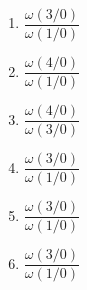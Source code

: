 \documentclass[10pt,fleqn]{article} %
\begin{document}
\begin{multicols}{2}
\begin{enumerate}
\item $\dfrac{\omega(3/0)}{\omega(1/0)}$
\item $\dfrac{\omega(4/0)}{\omega(1/0)}$
\item $\dfrac{\omega(4/0)}{\omega(3/0)}$
\item $\dfrac{\omega(3/0)}{\omega(1/0)}$
\item $\dfrac{\omega(3/0)}{\omega(1/0)}$
\item $\dfrac{\omega(3/0)}{\omega(1/0)}$
\end{enumerate}
%
%
%
%
%
%
%

\end{multicols}
\end{document}

